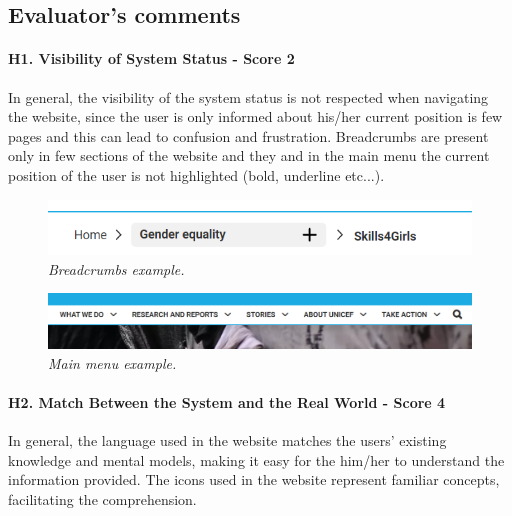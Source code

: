 \begin{small}
\begin{longtable}{l r}
\end{longtable}

\end{small}
\endgroup

\clearpage

\subsection*{Evaluator's comments}
\paragraph*{H1. Visibility of System Status - Score 2}
In general, the visibility of the system status is not respected when navigating the website, since the user is only informed about his/her current position is few pages and this can lead to confusion and frustration. 
Breadcrumbs are present only in few sections of the website and they and in the main menu the current position of the user is not highlighted (bold, underline etc...).

\begin{figure}[h]
	\centering
	\begin{center}
		\includegraphics{Picture1.png}
	\end{center}
	\captionsetup{font=small}
	\caption{\textit{Breadcrumbs example.}}
	\label{fig:label1}
\end{figure}

\begin{figure}[h]
	\centering
	\begin{center}
		\includegraphics[width=\textwidth]{Picture2.png}
	\end{center}
	\captionsetup{font=small}
	\caption{\textit{Main menu example.}}
	\label{fig:label2}
\end{figure}


\paragraph*{H2. Match Between the System and the Real World - Score 4}
In general, the language used in the website matches the users' existing knowledge and mental models, making it easy for the him/her to understand the information provided. The icons used in the website represent familiar concepts, facilitating the comprehension. 

